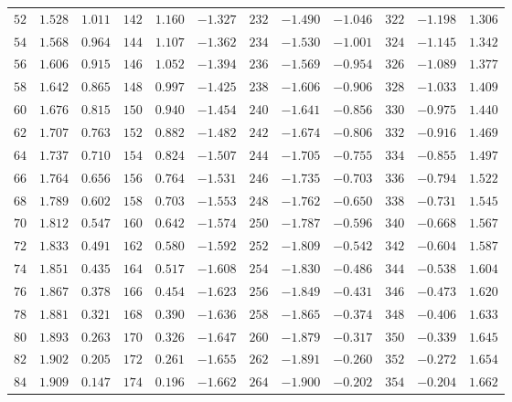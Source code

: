 \begin{table}[!h]
{\begin{tabular}{rrr|rrr|rrr|rrr}
 $52$ &  $1.528$ &  $1.011$ & $142$ &  $1.160$ & $-1.327$ & $232$ & $-1.490$ & $-1.046$ & $322$ & $-1.198$ &  $1.306$\\
 $54$ &  $1.568$ &  $0.964$ & $144$ &  $1.107$ & $-1.362$ & $234$ & $-1.530$ & $-1.001$ & $324$ & $-1.145$ &  $1.342$\\
 $56$ &  $1.606$ &  $0.915$ & $146$ &  $1.052$ & $-1.394$ & $236$ & $-1.569$ & $-0.954$ & $326$ & $-1.089$ &  $1.377$\\
 $58$ &  $1.642$ &  $0.865$ & $148$ &  $0.997$ & $-1.425$ & $238$ & $-1.606$ & $-0.906$ & $328$ & $-1.033$ &  $1.409$\\
 $60$ &  $1.676$ &  $0.815$ & $150$ &  $0.940$ & $-1.454$ & $240$ & $-1.641$ & $-0.856$ & $330$ & $-0.975$ &  $1.440$\\
 $62$ &  $1.707$ &  $0.763$ & $152$ &  $0.882$ & $-1.482$ & $242$ & $-1.674$ & $-0.806$ & $332$ & $-0.916$ &  $1.469$\\
 $64$ &  $1.737$ &  $0.710$ & $154$ &  $0.824$ & $-1.507$ & $244$ & $-1.705$ & $-0.755$ & $334$ & $-0.855$ &  $1.497$\\
 $66$ &  $1.764$ &  $0.656$ & $156$ &  $0.764$ & $-1.531$ & $246$ & $-1.735$ & $-0.703$ & $336$ & $-0.794$ &  $1.522$\\
 $68$ &  $1.789$ &  $0.602$ & $158$ &  $0.703$ & $-1.553$ & $248$ & $-1.762$ & $-0.650$ & $338$ & $-0.731$ &  $1.545$\\
 $70$ &  $1.812$ &  $0.547$ & $160$ &  $0.642$ & $-1.574$ & $250$ & $-1.787$ & $-0.596$ & $340$ & $-0.668$ &  $1.567$\\
 $72$ &  $1.833$ &  $0.491$ & $162$ &  $0.580$ & $-1.592$ & $252$ & $-1.809$ & $-0.542$ & $342$ & $-0.604$ &  $1.587$\\
 $74$ &  $1.851$ &  $0.435$ & $164$ &  $0.517$ & $-1.608$ & $254$ & $-1.830$ & $-0.486$ & $344$ & $-0.538$ &  $1.604$\\
 $76$ &  $1.867$ &  $0.378$ & $166$ &  $0.454$ & $-1.623$ & $256$ & $-1.849$ & $-0.431$ & $346$ & $-0.473$ &  $1.620$\\
 $78$ &  $1.881$ &  $0.321$ & $168$ &  $0.390$ & $-1.636$ & $258$ & $-1.865$ & $-0.374$ & $348$ & $-0.406$ &  $1.633$\\
 $80$ &  $1.893$ &  $0.263$ & $170$ &  $0.326$ & $-1.647$ & $260$ & $-1.879$ & $-0.317$ & $350$ & $-0.339$ &  $1.645$\\
 $82$ &  $1.902$ &  $0.205$ & $172$ &  $0.261$ & $-1.655$ & $262$ & $-1.891$ & $-0.260$ & $352$ & $-0.272$ &  $1.654$\\
 $84$ &  $1.909$ &  $0.147$ & $174$ &  $0.196$ & $-1.662$ & $264$ & $-1.900$ & $-0.202$ & $354$ & $-0.204$ &  $1.662$\\

\end{tabular}}
\end{table}
